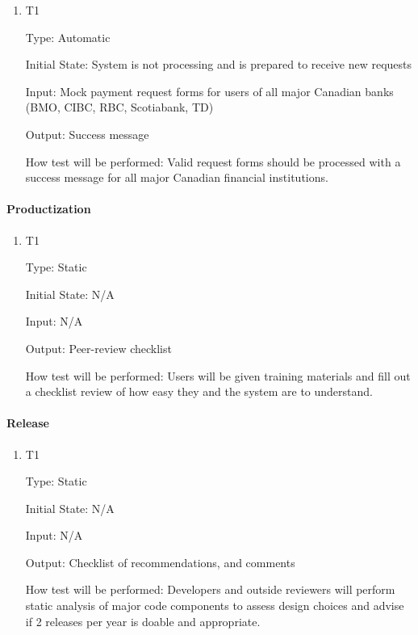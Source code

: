 \documentclass[12pt, titlepage]{article}
\begin{document}
\begin{enumerate}

\item{T1\\}

Type: Automatic

Initial State: System is not processing and is prepared to receive new requests

Input: Mock payment request forms for users of all major Canadian banks (BMO, CIBC, RBC, Scotiabank, TD)

Output: Success message

How test will be performed: Valid request forms should be processed with a success message for all major Canadian financial institutions.

\end{enumerate}

\paragraph{Productization}

\begin{enumerate}

\item{T1\\}
  
Type: Static 

Initial State: N/A

Input: N/A

Output: Peer-review checklist

How test will be performed: Users will be given training materials and fill out a checklist review of how easy they and the system are to understand.

\end{enumerate}

\paragraph{Release}

\begin{enumerate}

\item{T1\\}
  
Type: Static

Initial State: N/A

Input: N/A

Output: Checklist of recommendations, and comments

How test will be performed: Developers and outside reviewers will perform static analysis of major code components to assess design choices and advise if 2 releases per year is doable and appropriate.

\end{enumerate}
\end{document}
